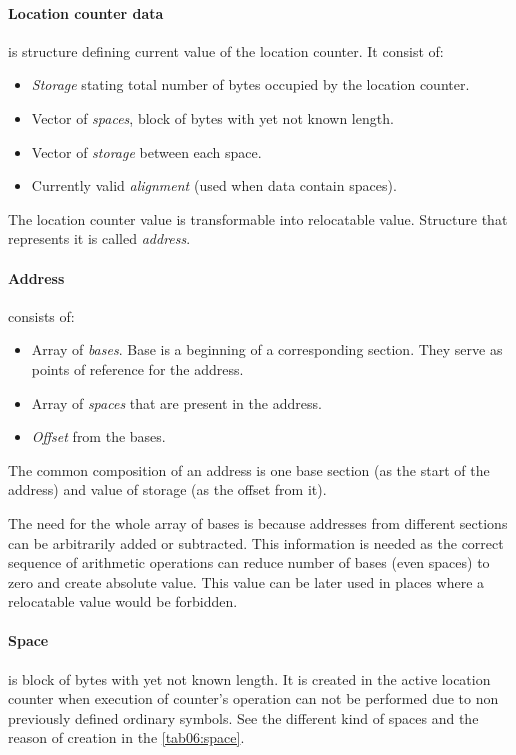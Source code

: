 \paragraph*{Location counter data} is structure defining current value of the location counter. It consist of:
\begin{itemize}
	\item \emph{Storage} stating total number of bytes occupied by the location counter.
	\item Vector of \emph{spaces}, block of bytes with yet not known length.
	\item Vector of \emph{storage} between each space.
	\item Currently valid \emph{alignment} (used when data contain spaces).
\end{itemize}

The location counter value is transformable into relocatable value. Structure that represents it is called \emph{address}.

\paragraph*{Address} consists of:
\begin{itemize}
	\item Array of \emph{bases}. Base is a beginning of a corresponding section. They serve as points of reference for the address.
	\item Array of \emph{spaces} that are present in the address. 
	\item \emph{Offset} from the bases.
\end{itemize}

The common composition of an address is one base section (as the start of the address) and value of storage (as the offset from it).

The need for the whole array of bases is because addresses from different sections can be arbitrarily added or subtracted. This information is needed as the correct sequence of arithmetic operations can reduce number of bases (even spaces) to zero and create absolute value. This value can be later used in places where a relocatable value would be forbidden.

\paragraph*{Space} is block of bytes with yet not known length. It is created in the active location counter when execution of counter's operation can not be performed due to non previously defined ordinary symbols. See the different kind of spaces and the reason of creation in  the \cref{tab06:space}.

